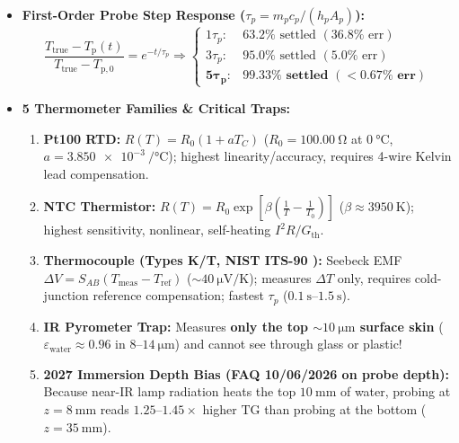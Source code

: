 \documentclass[10pt,twoside,openany,letterpaper]{book}
\begin{document}
\begin{quicksheet}
\begin{twocol}[0.50]
\begin{formulacard}
\begin{itemize}
\end{itemize}
\end{formulacard}
\nextcol[0.48]
\begin{formulacard}
\scriptsize
\begin{itemize}
  \item \textbf{First-Order Probe Step Response ($\tau_p = m_p c_p / (h_p A_p)$):}
  \[
    \frac{T_{\mathrm{true}} - T_{\mathrm{p}}(t)}{T_{\mathrm{true}} - T_{\mathrm{p},0}} = e^{-t/\tau_p} \Rightarrow \begin{cases} 1\tau_p: & 63.2\%\text{ settled } (36.8\%\text{ err})\\ 3\tau_p: & 95.0\%\text{ settled } (5.0\%\text{ err})\\ \mathbf{5\tau_p}: & \mathbf{99.33\%\text{ settled } (<0.67\%\text{ err})} \end{cases}
  \]
  \item \textbf{5 Thermometer Families \& Critical Traps:}
  \begin{enumerate}
    \item \textbf{Pt100 RTD:} $R(T) = R_0(1 + a T_C)$ ($R_0 = \SI{100.00}{\ohm}$ at $\SI{0}{\celsius}$, $a = \SI{3.850e-3}{\per\celsius}$); highest linearity/accuracy, requires 4-wire Kelvin lead compensation.
    \item \textbf{NTC Thermistor:} $R(T) = R_0\exp\left[\beta\left(\frac{1}{T} - \frac{1}{T_0}\right)\right]$ ($\beta \approx \SI{3950}{\kelvin}$); highest sensitivity, nonlinear, self-heating $I^2R / G_{\mathrm{th}}$.
    \item \textbf{Thermocouple (Types K/T, NIST ITS-90 ):} Seebeck EMF $\Delta V = S_{AB}(T_{\mathrm{meas}} - T_{\mathrm{ref}})$ ($\sim\SI{40}{\micro\volt\per\kelvin}$); measures $\Delta T$ only, requires cold-junction reference compensation; fastest $\tau_p$ ($\SIrange{0.1}{1.5}{\second}$).
    \item \textbf{IR Pyrometer Trap:} Measures \textbf{only the top $\sim\SI{10}{\micro\meter}$ surface skin} ($\varepsilon_{\mathrm{water}} \approx 0.96$ in $8\text{--}\SI{14}{\micro\meter}$) and cannot see through glass or plastic!
    \item \textbf{2027 Immersion Depth Bias (FAQ 10/06/2026 on probe depth):} Because near-IR lamp radiation heats the top $\SI{10}{\milli\meter}$ of water, probing at $z = \SI{8}{\milli\meter}$ reads $1.25\text{--}1.45\times$ higher $\mathrm{TG}$ than probing at the bottom ($z = \SI{35}{\milli\meter}$).
  \end{enumerate}
\end{itemize}
\end{formulacard}
\end{twocol}


\end{quicksheet}
\end{document}
